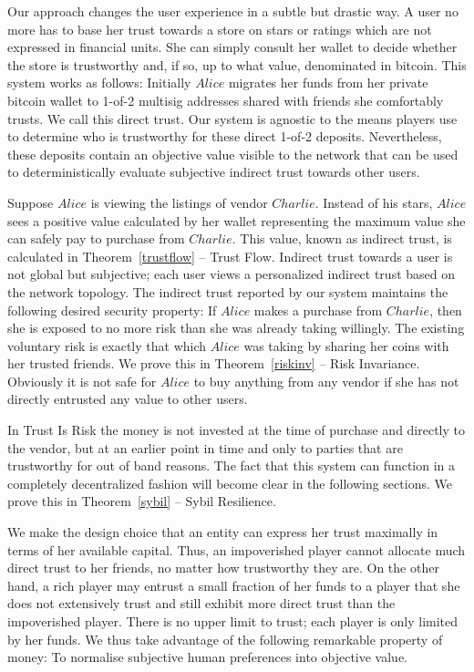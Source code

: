   Our approach changes the user experience in a subtle but drastic way. A user no more has to base her trust towards a
  store on stars or ratings which are not expressed in financial units. She can simply consult her wallet to decide whether
  the store is trustworthy and, if so, up to what value, denominated in bitcoin. This system works as follows: Initially
  $Alice$ migrates her funds from her private bitcoin wallet to 1-of-2 multisig addresses shared with friends she
  comfortably trusts. We call this direct trust. Our system is agnostic to the means players use to determine who is
  trustworthy for these direct 1-of-2 deposits. Nevertheless, these deposits contain an objective value visible to the network
  that can be used to deterministically evaluate subjective indirect trust towards other users.

  Suppose $Alice$ is viewing the listings of vendor $Charlie$. Instead of his stars, $Alice$ sees a positive value calculated
  by her wallet representing the maximum value she can safely pay to purchase from $Charlie$. This value, known as indirect
  trust, is calculated in Theorem~\ref{trustflow} -- Trust Flow. Indirect trust towards a user is not global but subjective;
  each user views a personalized indirect trust based on the network topology.  The indirect trust reported by our system
  maintains the following desired security property: If $Alice$ makes a purchase from $Charlie$, then she is exposed to no
  more risk than she was already taking willingly. The existing voluntary risk is exactly that which $Alice$ was taking by
  sharing her coins with her trusted friends. We prove this in Theorem~\ref{riskinv} -- Risk Invariance. Obviously it is not
  safe for $Alice$ to buy anything from any vendor if she has not directly entrusted any value to other users.

  In Trust Is Risk the money is not invested at the time of purchase and directly to the vendor, but at an earlier point in
  time and only to parties that are trustworthy for out of band reasons. The fact that this system can function in a
  completely decentralized fashion will become clear in the following sections. We prove this in Theorem~\ref{sybil} -- Sybil
  Resilience.

  We make the design choice that an entity can express her trust maximally in terms of her available capital. Thus, an
  impoverished player cannot allocate much direct trust to her friends, no matter how trustworthy they are. On the other hand,
  a rich player may entrust a small fraction of her funds to a player that she does not extensively trust and still exhibit
  more direct trust than the impoverished player. There is no upper limit to trust; each player is only limited by her funds.
  We thus take advantage of the following remarkable property of money: To normalise subjective human preferences into
  objective value.

